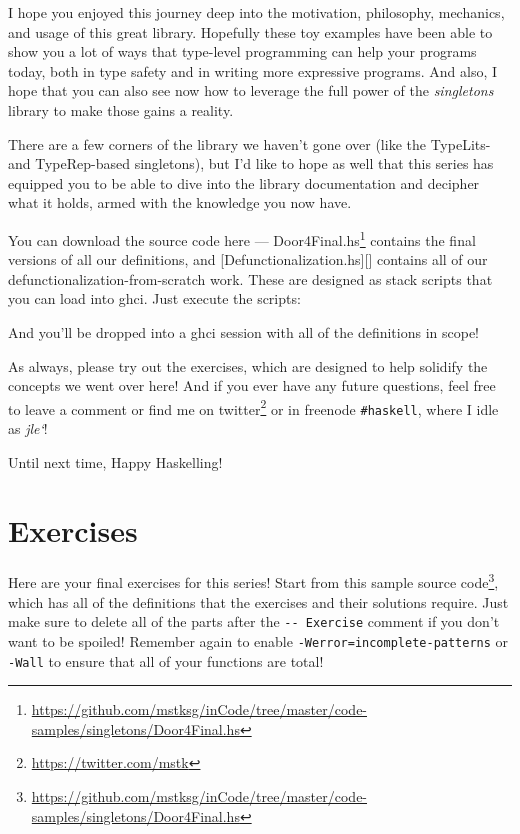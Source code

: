 \documentclass[]{article}
\newenvironment{Shaded}{}{}
\newcommand{\ExtensionTok}[1]{#1}
\newcommand{\NormalTok}[1]{#1}
\newcommand{\OperatorTok}[1]{\textcolor[rgb]{0.40,0.40,0.40}{#1}}
\renewcommand{\href}[2]{#2\footnote{\url{#1}}}
\begin{document}
I hope you enjoyed this journey deep into the motivation, philosophy, mechanics,
and usage of this great library. Hopefully these toy examples have been able to
show you a lot of ways that type-level programming can help your programs today,
both in type safety and in writing more expressive programs. And also, I hope
that you can also see now how to leverage the full power of the
\emph{singletons} library to make those gains a reality.

There are a few corners of the library we haven't gone over (like the TypeLits-
and TypeRep-based singletons), but I'd like to hope as well that this series has
equipped you to be able to dive into the library documentation and decipher what
it holds, armed with the knowledge you now have.

You can download the source code here ---
\href{https://github.com/mstksg/inCode/tree/master/code-samples/singletons/Door4Final.hs}{Door4Final.hs}
contains the final versions of all our definitions, and
{[}Defunctionalization.hs{]}{[}{]} contains all of our
defunctionalization-from-scratch work. These are designed as stack scripts that
you can load into ghci. Just execute the scripts:

\begin{Shaded}
\end{Shaded}

And you'll be dropped into a ghci session with all of the definitions in scope!

As always, please try out the exercises, which are designed to help solidify the
concepts we went over here! And if you ever have any future questions, feel free
to leave a comment or find me on \href{https://twitter.com/mstk}{twitter} or in
freenode \texttt{\#haskell}, where I idle as \emph{jle`}!

Until next time, Happy Haskelling!

\hypertarget{exercises}{%
\section{Exercises}\label{exercises}}

Here are your final exercises for this series! Start from
\href{https://github.com/mstksg/inCode/tree/master/code-samples/singletons/Door4Final.hs}{this
sample source code}, which has all of the definitions that the exercises and
their solutions require. Just make sure to delete all of the parts after the
\texttt{-\/-\ Exercise} comment if you don't want to be spoiled! Remember again
to enable \texttt{-Werror=incomplete-patterns} or \texttt{-Wall} to ensure that
all of your functions are total!
\end{document}
